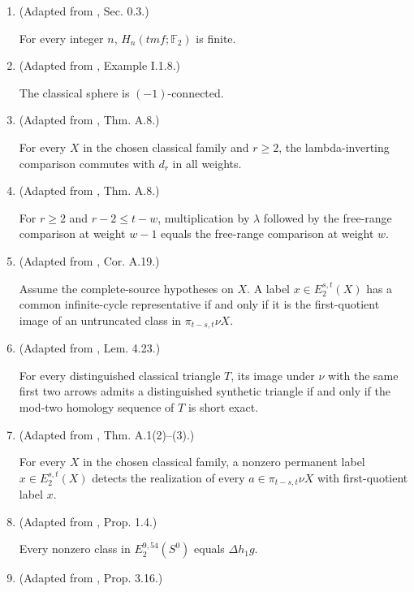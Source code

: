 \begin{theorem}
\begin{enumerate}
The label $h_1\in E_2^{1,2}(S^0)$ is a nonzero permanent cycle.
\item (Adapted from \cite{BR21}, Sec. 0.3.)\par{}

For every integer $n$, $H_n(\mathit{tmf};\mathbb F_2)$ is finite.
\item (Adapted from \cite{SchwedeSymmetricSpectra}, Example I.1.8.)\par{}

The classical sphere is $(-1)$-connected.
\item (Adapted from \cite{BHS}, Thm. A.8.)\par{}

For every $X$ in the chosen classical family and $r\ge2$, the lambda-inverting comparison commutes with $d_r$ in all weights.
\item (Adapted from \cite{BHS}, Thm. A.8.)\par{}

For $r\ge2$ and $r-2\le t-w$, multiplication by $\lambda$ followed by the free-range comparison at weight $w-1$ equals the free-range comparison at weight $w$.
\item (Adapted from \cite{BHS}, Cor. A.19.)\par{}

Assume the complete-source hypotheses on $X$. A label $x\in E_2^{s,t}(X)$ has a common infinite-cycle representative if and only if it is the first-quotient image of an untruncated class in $\pi_{t-s,t}\nu X$.
\item (Adapted from \cite{Pst}, Lem. 4.23.)\par{}

For every distinguished classical triangle $T$, its image under $\nu$ with the same first two arrows admits a distinguished synthetic triangle if and only if the mod-two homology sequence of $T$ is short exact.
\item (Adapted from \cite{BHS}, Thm. A.1(2)--(3).)\par{}

For every $X$ in the chosen classical family, a nonzero permanent label $x\in E_2^{s,t}(X)$ detects the realization of every $a\in\pi_{t-s,t}\nu X$ with first-quotient label $x$.
\item (Adapted from \cite{BR21}, Prop. 1.4.)\par{}

Every nonzero class in $E_2^{9,54}(S^0)$ equals $\Delta h_1g$.
\item (Adapted from \cite{LWX126}, Prop. 3.16.)\par{}


\end{enumerate}
\end{theorem}
